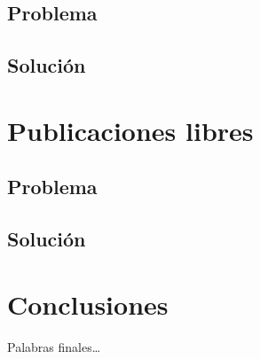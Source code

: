 \documentclass[
]{book}
\begin{document}
\hypertarget{problema-2}{%
\section{Problema}\label{problema-2}}

\hypertarget{soluciuxf3n-2}{%
\section{Solución}\label{soluciuxf3n-2}}

\hypertarget{publicaciones-libres}{%
\chapter{Publicaciones libres}\label{publicaciones-libres}}

\hypertarget{problema-3}{%
\section{Problema}\label{problema-3}}

\hypertarget{soluciuxf3n-3}{%
\section{Solución}\label{soluciuxf3n-3}}

\hypertarget{conclusiones}{%
\chapter{Conclusiones}\label{conclusiones}}

Palabras finales\ldots{}

  
\end{document}
